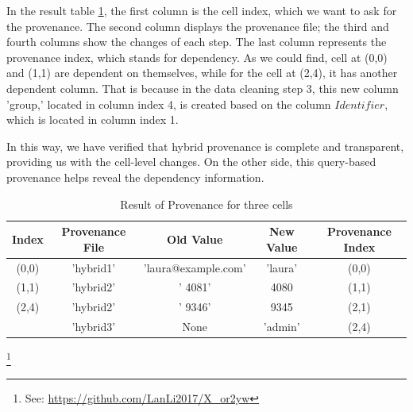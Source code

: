 In the result table \ref{tab:DTA_usecase}, the first column is the cell index, which we want to ask for the provenance. The second column displays the provenance file; the third and fourth columns show the changes of each step. The last column represents the provenance index, which stands for dependency. As we could find, cell at (0,0) and (1,1) are dependent on themselves, while for the cell at (2,4), it has another dependent column. That is because in the data cleaning step 3, this new column 'group,' located in column index 4, is created based on the column $Identifier$, which is located in column index 1.  

In this way, we have verified that hybrid provenance is complete and transparent, providing us with the cell-level changes. On the other side, this query-based provenance helps reveal the dependency information. 

\begin{table}
    \centering
    \begin{tabular}{c|c|c|c|c}
    \hline
    \textbf{Index} & Provenance File & Old Value & New Value & Provenance Index \\
    \hline
    (0,0) & 'hybrid1' & 'laura@example.com' & 'laura' & (0,0) \\
    \hline
    (1,1) & 'hybrid2' & ' 4081'& 4080 & (1,1) \\
    \hline
    (2,4) & 'hybrid2' & ' 9346' & 9345 & (2,1) \\
     & 'hybrid3' & None & 'admin' & (2,4) \\
    \hline
    \end{tabular}
    \caption{Result of Provenance for three cells}
    \label{tab:DTA_usecase}
\end{table}





\footnote{See: \url{https://github.com/LanLi2017/X_or2yw}}